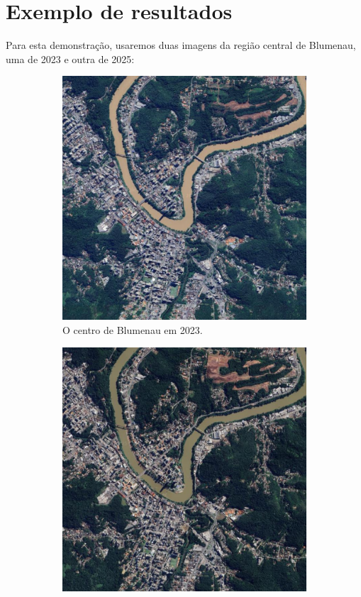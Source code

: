 \documentclass{article}
\begin{document}
\section{Exemplo de resultados}

Para esta demonstração, usaremos duas imagens da região central de Blumenau, uma de 2023 e outra de 2025:

\begin{figure}[H]
    \centering
    \begin{subfigure}[b]{0.48\textwidth}
        \includegraphics[width=\textwidth]{../Imagens/012023.png}
        \caption{O centro de Blumenau em 2023.}
        \label{2023}
    \end{subfigure}
    \hfill %
    \begin{subfigure}[b]{0.48\textwidth}
        \includegraphics[width=\textwidth]{../Imagens/012025.png}

\end{subfigure}
\end{figure}
\end{document}
